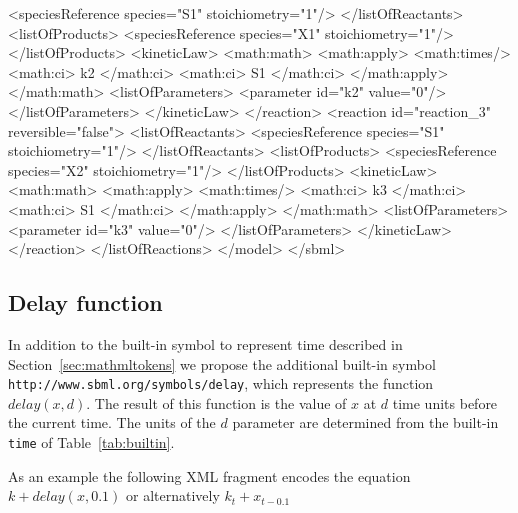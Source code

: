 \documentclass[10pt]{cekarticle}
\newcommand{\vref}[1]{\ref{#1}}
\begin{document}
\begin{example}
                    <speciesReference species="S1" stoichiometry="1"/>
                </listOfReactants>
                <listOfProducts>
                    <speciesReference species="X1" stoichiometry="1"/>
                </listOfProducts>
                <kineticLaw>
                    <math:math>
                        <math:apply>
                            <math:times/>
                            <math:ci> k2 </math:ci>
                            <math:ci> S1 </math:ci>
                        </math:apply>
                    </math:math>
                    <listOfParameters>
                        <parameter id="k2" value="0"/>
                    </listOfParameters>
                </kineticLaw>
            </reaction>
            <reaction id="reaction_3" reversible="false">
                <listOfReactants>
                    <speciesReference species="S1" stoichiometry="1"/>
                </listOfReactants>
                <listOfProducts>
                    <speciesReference species="X2" stoichiometry="1"/>
                </listOfProducts>
                <kineticLaw>
                    <math:math>
                        <math:apply>
                            <math:times/>
                            <math:ci> k3 </math:ci>
                            <math:ci> S1 </math:ci>
                        </math:apply>
                    </math:math>
                    <listOfParameters>
                        <parameter id="k3" value="0"/>
                    </listOfParameters>
                </kineticLaw>
            </reaction>
        </listOfReactions>
    </model>
</sbml>
\end{example}
\subsection{Delay function}
\label{sec:delay}

In addition to the built-in symbol to represent time described in Section~\ref{sec:mathmltokens} we propose the additional built-in symbol \texttt{http://www.sbml.org/symbols/delay}, which represents the function $delay(x, d)$.  The result of this function is the value of $x$ at $d$ time units before the current time.  The units of the $d$ parameter are determined from the built-in \texttt{time} of Table~\vref{tab:builtin}.

As an example the following XML fragment encodes the equation $k + delay(x, 0.1)$ or alternatively $k_t + x_{t - 0.1}$
\end{document}
